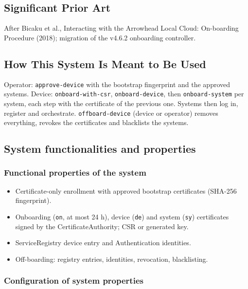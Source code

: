 \documentclass[a4paper]{arrowhead}
\begin{document}
\newpage

\subsection{Significant Prior Art}
\label{sec:prior_art}

After Bicaku et al., Interacting with the Arrowhead Local Cloud: On-boarding Procedure (2018); migration of the v4.6.2 onboarding controller.

\subsection{How This System Is Meant to Be Used}
\label{sec:use}

Operator: \texttt{approve-\allowbreak{}device} with the bootstrap fingerprint and the approved systems. Device: \texttt{onboard-\allowbreak{}with-\allowbreak{}csr}, \texttt{onboard-\allowbreak{}device}, then \texttt{onboard-\allowbreak{}system} per system, each step with the certificate of the previous one. Systems then log in, register and orchestrate. \texttt{offboard-\allowbreak{}device} (device or operator) removes everything, revokes the certificates and blacklists the systems.

\subsection{System functionalities and properties}
\label{sec:properties}

\subsubsection{Functional properties of the system}

\begin{itemize}
  \item Certificate-only enrollment with approved bootstrap certificates (SHA-256 fingerprint).
  \item Onboarding (\texttt{on}, at most 24 h), device (\texttt{de}) and system (\texttt{sy}) certificates signed by the Certificate\allowbreak{}Authority; CSR or generated key.
  \item ServiceRegistry device entry and Authentication identities.
  \item Off-boarding: registry entries, identities, revocation, blacklisting.
\end{itemize}

\subsubsection{Configuration of system properties}
\end{document}
